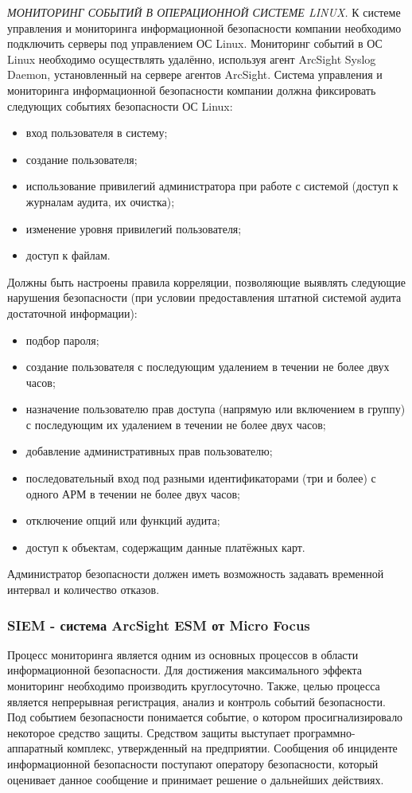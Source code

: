 \textit{МОНИТОРИНГ СОБЫТИЙ В ОПЕРАЦИОННОЙ СИСТЕМЕ LINUX.}
К системе управления и мониторинга информационной безопасности компании необходимо подключить серверы под управлением ОС Linux. Мониторинг событий в ОС Linux необходимо осуществлять удалённо, используя агент ArcSight Syslog Daemon, установленный на сервере агентов ArcSight.
Система управления и мониторинга информационной безопасности компании должна фиксировать следующих событиях безопасности ОС Linux:
\begin{itemize}
    \item вход пользователя в систему;
    \item создание пользователя;
    \item использование привилегий администратора при работе с системой (доступ к журналам аудита, их очистка);
    \item изменение уровня привилегий пользователя;
    \item доступ к файлам.
\end{itemize}
Должны быть настроены правила корреляции, позволяющие выявлять следующие нарушения безопасности (при условии предоставления штатной системой аудита достаточной информации):
\begin{itemize}
    \item подбор пароля;
    \item создание пользователя с последующим удалением в течении не более двух часов;
    \item назначение пользователю прав доступа (напрямую или включением в группу) с последующим их удалением в течении не более двух часов;
    \item добавление административных прав пользователю;
    \item последовательный вход под разными идентификаторами (три и более) с одного АРМ в течении не более двух часов;
    \item отключение опций или функций аудита;
     \item доступ к объектам, содержащим данные платёжных карт.
\end{itemize}
Администратор безопасности должен иметь возможность задавать временной интервал и количество отказов.

\subsubsection{SIEM - система ArcSight ESM от Micro Focus}

Процесс мониторинга является одним из основных процессов в области информационной безопасности. Для достижения максимального эффекта мониторинг необходимо производить круглосуточно. Также, целью процесса является непрерывная регистрация, анализ и контроль событий безопасности. Под событием безопасности понимается событие, о котором просигнализировало некоторое средство защиты. Средством защиты выступает программно-аппаратный комплекс, утвержденный на предприятии. Сообщения об инциденте информационной безопасности поступают оператору безопасности, который оценивает данное сообщение и принимает решение о дальнейших действиях.

